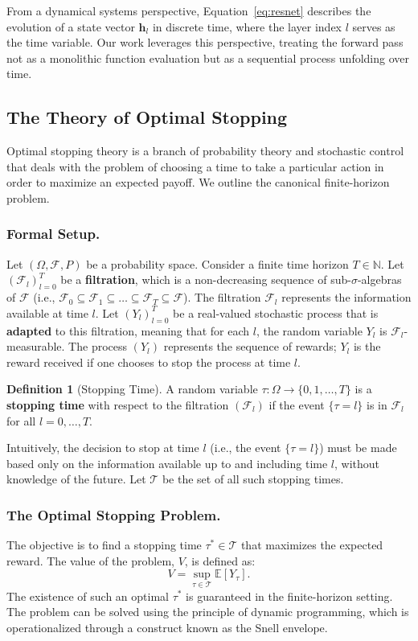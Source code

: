 \documentclass[12pt]{imsart}
\newcommand{\E}{\mathbb{E}}
\newcommand{\F}{\mathcal{F}}
\newcommand{\h}{\mathbf{h}}
\theoremstyle{plain}
\theoremstyle{definition}
\newtheorem{definition}[theorem]{Definition}
\begin{document}
From a dynamical systems perspective, Equation~\eqref{eq:resnet} describes the evolution of a state vector $\h_l$ in discrete time, where the layer index $l$ serves as the time variable. Our work leverages this perspective, treating the forward pass not as a monolithic function evaluation but as a sequential process unfolding over time.

\subsection{The Theory of Optimal Stopping}
Optimal stopping theory is a branch of probability theory and stochastic control that deals with the problem of choosing a time to take a particular action in order to maximize an expected payoff. We outline the canonical finite-horizon problem.

\subsubsection{Formal Setup.}
Let $(\Omega, \F, P)$ be a probability space. Consider a finite time horizon $T \in \mathbb{N}$. Let $(\F_l)_{l=0}^T$ be a \textbf{filtration}, which is a non-decreasing sequence of sub-$\sigma$-algebras of $\F$ (i.e., $\F_0 \subseteq \F_1 \subseteq \dots \subseteq \F_T \subseteq \F$). The filtration $\F_l$ represents the information available at time $l$. Let $(Y_l)_{l=0}^T$ be a real-valued stochastic process that is \textbf{adapted} to this filtration, meaning that for each $l$, the random variable $Y_l$ is $\F_l$-measurable. The process $(Y_l)$ represents the sequence of rewards; $Y_l$ is the reward received if one chooses to stop the process at time $l$.

\begin{definition}[Stopping Time]\label{def:stopping_time}
A random variable $\tau: \Omega \to \{0, 1, \dots, T\}$ is a \textbf{stopping time} with respect to the filtration $(\F_l)$ if the event $\{\tau = l\}$ is in $\F_l$ for all $l=0, \dots, T$.
\end{definition}

Intuitively, the decision to stop at time $l$ (i.e., the event $\{\tau = l\}$) must be made based only on the information available up to and including time $l$, without knowledge of the future. Let $\mathcal{T}$ be the set of all such stopping times.

\subsubsection{The Optimal Stopping Problem.}
The objective is to find a stopping time $\tau^* \in \mathcal{T}$ that maximizes the expected reward. The value of the problem, $V$, is defined as:
\begin{equation}
V = \sup_{\tau \in \mathcal{T}} \E[Y_\tau].
\end{equation}
The existence of such an optimal $\tau^*$ is guaranteed in the finite-horizon setting. The problem can be solved using the principle of dynamic programming, which is operationalized through a construct known as the Snell envelope.
\end{document}
